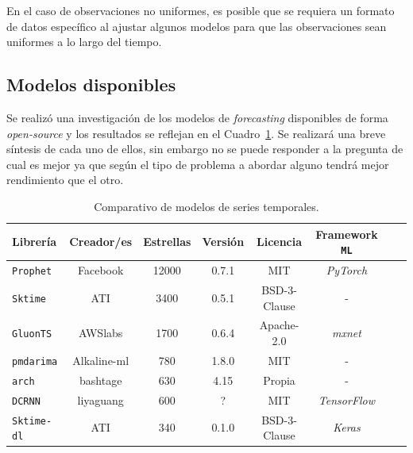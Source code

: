 \documentclass[a4paper,12pt]{article}
\begin{document}
En el caso de observaciones no uniformes, es posible que se requiera un formato de datos específico al ajustar algunos modelos para que las observaciones sean uniformes a lo largo del tiempo.

\subsection{Modelos disponibles}

Se realizó una investigación de los modelos de \textit{forecasting} disponibles de forma \textit{open-source} y los resultados se reflejan en el Cuadro~\ref{tab:ts-models}. Se realizará una breve síntesis de cada uno de ellos, sin embargo no se puede responder a la pregunta de cual es mejor ya que según el tipo de problema a abordar alguno tendrá mejor rendimiento que el otro.

\begin{table}[H]
\centering
\begin{adjustwidth}{-0.5cm}{}
\begin{tabular}{l|ccccccc}
Librería & Creador/es   & Estrellas & Versión     & Licencia     & Framework \texttt{ML} \\ \hline
\texttt{Prophet}          & Facebook                      & 12000              & 0.7.1          & MIT          & \textit{PyTorch}      \\
\texttt{Sktime}           & ATI  & 3400               & 0.5.1          & BSD-3-Clause & -            \\
\texttt{GluonTS}          & AWSlabs                           & 1700               & 0.6.4        & Apache-2.0   & \textit{mxnet}        \\
\texttt{pmdarima}         & Alkaline-ml                          & 780                & 1.8.0          & MIT          & -            \\
\texttt{arch}             & bashtage                                    & 630                & 4.15           & Propia       & -            \\
\texttt{DCRNN}            & liyaguang                                  & 600          &  ?                    & MIT          & \textit{TensorFlow}   \\
\texttt{Sktime-dl}        & ATI                    & 340                & 0.1.0   & BSD-3-Clause & \textit{Keras}       
\end{tabular}
\end{adjustwidth}
\caption{Comparativo de modelos de series temporales.}
\label{tab:ts-models}
\end{table}
\end{document}
